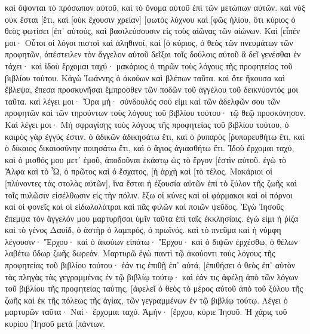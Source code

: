 καὶ ὄψονται τὸ πρόσωπον αὐτοῦ, καὶ τὸ ὄνομα αὐτοῦ ἐπὶ τῶν μετώπων αὐτῶν. 
καὶ νὺξ οὐκ ἔσται [ἔτι, καὶ [οὐκ ἔχουσιν χρείαν] [φωτὸς λύχνου καὶ [φῶς ἡλίου, ὅτι κύριος ὁ θεὸς φωτίσει [ἐπ᾽ αὐτούς, καὶ βασιλεύσουσιν εἰς τοὺς αἰῶνας τῶν αἰώνων. 
Καὶ [εἶπέν μοι· Οὗτοι οἱ λόγοι πιστοὶ καὶ ἀληθινοί, καὶ [ὁ κύριος, ὁ θεὸς τῶν πνευμάτων τῶν προφητῶν, ἀπέστειλεν τὸν ἄγγελον αὐτοῦ δεῖξαι τοῖς δούλοις αὐτοῦ ἃ δεῖ γενέσθαι ἐν τάχει· 
καὶ ἰδοὺ ἔρχομαι ταχύ· μακάριος ὁ τηρῶν τοὺς λόγους τῆς προφητείας τοῦ βιβλίου τούτου. 
Κἀγὼ Ἰωάννης ὁ ἀκούων καὶ βλέπων ταῦτα. καὶ ὅτε ἤκουσα καὶ ἔβλεψα, ἔπεσα προσκυνῆσαι ἔμπροσθεν τῶν ποδῶν τοῦ ἀγγέλου τοῦ δεικνύοντός μοι ταῦτα. 
καὶ λέγει μοι· Ὅρα μή· σύνδουλός σού εἰμι καὶ τῶν ἀδελφῶν σου τῶν προφητῶν καὶ τῶν τηρούντων τοὺς λόγους τοῦ βιβλίου τούτου· τῷ θεῷ προσκύνησον. 
Καὶ λέγει μοι· Μὴ σφραγίσῃς τοὺς λόγους τῆς προφητείας τοῦ βιβλίου τούτου, ὁ καιρὸς γὰρ ἐγγύς ἐστιν. 
ὁ ἀδικῶν ἀδικησάτω ἔτι, καὶ ὁ ῥυπαρὸς [ῥυπαρευθήτω ἔτι, καὶ ὁ δίκαιος δικαιοσύνην ποιησάτω ἔτι, καὶ ὁ ἅγιος ἁγιασθήτω ἔτι. 
Ἰδοὺ ἔρχομαι ταχύ, καὶ ὁ μισθός μου μετ᾽ ἐμοῦ, ἀποδοῦναι ἑκάστῳ ὡς τὸ ἔργον [ἐστὶν αὐτοῦ. 
ἐγὼ τὸ Ἄλφα καὶ τὸ Ὦ, ὁ πρῶτος καὶ ὁ ἔσχατος, [ἡ ἀρχὴ καὶ [τὸ τέλος. 
Μακάριοι οἱ [πλύνοντες τὰς στολὰς αὐτῶν], ἵνα ἔσται ἡ ἐξουσία αὐτῶν ἐπὶ τὸ ξύλον τῆς ζωῆς καὶ τοῖς πυλῶσιν εἰσέλθωσιν εἰς τὴν πόλιν. 
ἔξω οἱ κύνες καὶ οἱ φάρμακοι καὶ οἱ πόρνοι καὶ οἱ φονεῖς καὶ οἱ εἰδωλολάτραι καὶ πᾶς φιλῶν καὶ ποιῶν ψεῦδος. 
Ἐγὼ Ἰησοῦς ἔπεμψα τὸν ἄγγελόν μου μαρτυρῆσαι ὑμῖν ταῦτα ἐπὶ ταῖς ἐκκλησίαις. ἐγώ εἰμι ἡ ῥίζα καὶ τὸ γένος Δαυίδ, ὁ ἀστὴρ ὁ λαμπρός, ὁ πρωϊνός. 
καὶ τὸ πνεῦμα καὶ ἡ νύμφη λέγουσιν· Ἔρχου· καὶ ὁ ἀκούων εἰπάτω· Ἔρχου· καὶ ὁ διψῶν ἐρχέσθω, ὁ θέλων λαβέτω ὕδωρ ζωῆς δωρεάν. 
Μαρτυρῶ ἐγὼ παντὶ τῷ ἀκούοντι τοὺς λόγους τῆς προφητείας τοῦ βιβλίου τούτου· ἐάν τις ἐπιθῇ ἐπ᾽ αὐτά, [ἐπιθήσει ὁ θεὸς ἐπ᾽ αὐτὸν τὰς πληγὰς τὰς γεγραμμένας ἐν τῷ βιβλίῳ τούτῳ· 
καὶ ἐάν τις ἀφέλῃ ἀπὸ τῶν λόγων τοῦ βιβλίου τῆς προφητείας ταύτης, [ἀφελεῖ ὁ θεὸς τὸ μέρος αὐτοῦ ἀπὸ τοῦ ξύλου τῆς ζωῆς καὶ ἐκ τῆς πόλεως τῆς ἁγίας, τῶν γεγραμμένων ἐν τῷ βιβλίῳ τούτῳ. 
Λέγει ὁ μαρτυρῶν ταῦτα· Ναί· ἔρχομαι ταχύ. Ἀμήν· [ἔρχου, κύριε Ἰησοῦ. 
Ἡ χάρις τοῦ κυρίου [Ἰησοῦ μετὰ [πάντων. 
